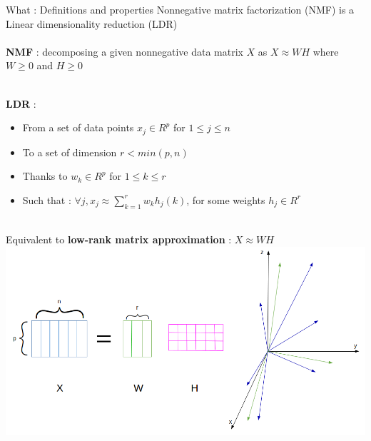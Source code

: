 \begin{frame}{What : Definitions and properties}
     Nonnegative matrix factorization (NMF) is a Linear dimensionality reduction (LDR) \\
         ~\\
         

     \textbf{NMF} : decomposing a given nonnegative data matrix $X$ as $X \approx W H$ where $W \geq 0$ and $H \geq 0$ %
     
          ~\\
          
     \textbf{LDR} : \\
     \begin{itemize}
         \item From a set of data points $x_j \in R^{p}$ for $1 \leq j \leq n$ 
         \item To a set of dimension $r < min(p,n)$
         \item Thanks to $w_k \in R^p$ for $1 \leq k \leq r$
         \item Such that : $\forall j, x_j \approx \sum_{k = 1}^{r} w_{k} h_{j}(k)$, for some weights $h_j\in R^r$
     \end{itemize}
              ~\\
     Equivalent to \textbf{low-rank matrix approximation} : $X \approx W H$\\
     
     \centering
\includegraphics[scale=0.28]{../images/NMFvect.png}


\end{frame}
